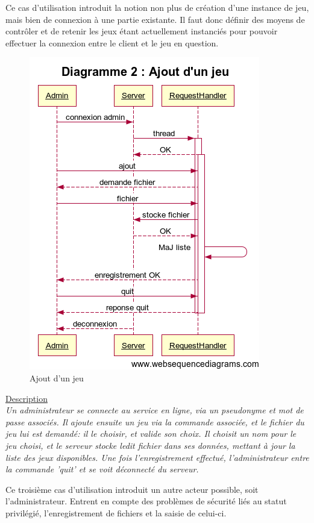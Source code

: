 \vspace{3em}
Ce cas d'utilisation introduit la notion non plus de création d'une instance de jeu, mais bien de connexion à une partie existante. Il faut donc définir des moyens de contrôler et de retenir les jeux étant actuellement instanciés pour pouvoir effectuer la connexion entre le client et le jeu en question.
\newpage


\begin{figure}[!ht]
	\center
	\includegraphics[scale=0.7]{images/sequence/diagramme_ajout.png}
	\caption{Ajout d'un jeu}
\end{figure}

\underline{Description}\\

\textit{Un administrateur se connecte au service en ligne, via un pseudonyme et mot de passe associés. Il ajoute ensuite un jeu via la commande associée, et le fichier du jeu lui est demandé: il le choisir, et valide son choix. Il choisit un nom pour le jeu choisi, et le serveur stocke ledit fichier dans ses données, mettant  à jour la liste des jeux disponibles. Une fois l'enregistrement effectué, l'administrateur entre la commande 'quit' et se voit déconnecté du serveur.}\\

\vspace{3em}

Ce troisième cas d'utilisation introduit un autre acteur possible, soit l'administrateur. Entrent en compte des problèmes de sécurité liés au statut privilégié, l'enregistrement de fichiers et la saisie de celui-ci.
